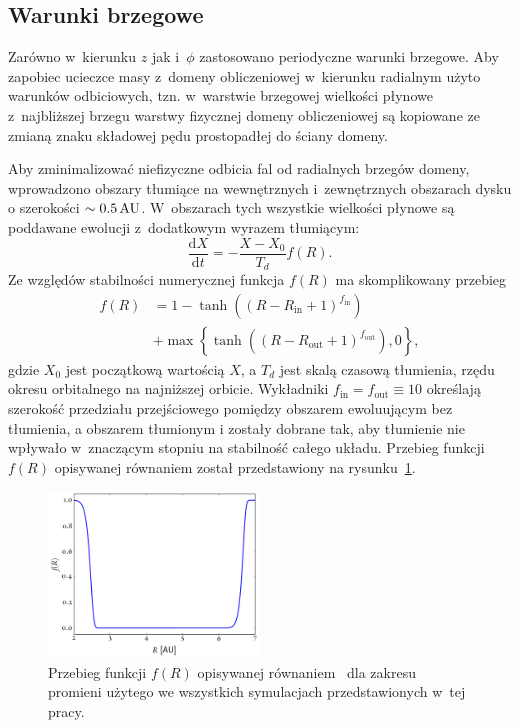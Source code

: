 \subsection{Warunki brzegowe}
Zarówno w~kierunku $z$ jak i~$\phi$ zastosowano periodyczne warunki brzegowe.
Aby zapobiec ucieczce masy z~domeny obliczeniowej w~kierunku radialnym użyto
warunków odbiciowych, tzn. w~warstwie brzegowej wielkości płynowe z~najbliższej
brzegu warstwy fizycznej domeny obliczeniowej są kopiowane ze zmianą znaku
składowej pędu prostopadłej do ściany domeny.

\par Aby zminimalizować niefizyczne odbicia fal od radialnych brzegów domeny,
wprowadzono obszary tłumiące na wewnętrznych i~zewnętrznych obszarach dysku o
szerokości $\sim0.5\hbox{$\thinspace\textrm{AU}$}$. W~obszarach tych wszystkie wielkości płynowe są
poddawane ewolucji z~dodatkowym wyrazem tłumiącym:
\begin{equation}
  \frac{\textrm{d}X}{\textrm{d}t} = - \frac{X-X_0}{T_d}f(R).
\end{equation}
Ze względów stabilności numerycznej funkcja $f(R)$ ma skomplikowany przebieg
\begin{equation}\label{eq:overlap}
   \begin{split} 
      f(R) &= 1 - \tanh\left(\left(R - R_\textrm{in} + 1
      \right)^{f_\textrm{in}}\right)\\ &+ \max\left\{ \tanh\left(\left(R -
      R_\textrm{out} + 1\right)^{f_\textrm{out}}\right), 0\right\}, 
   \end{split}
\end{equation}
gdzie $X_0$ jest początkową wartością $X$, a $T_d$ jest skalą czasową tłumienia,
rzędu okresu orbitalnego na najniższej orbicie.
Wykładniki $f_\textrm{in}=f_\textrm{out}\equiv10$ określają szerokość przedziału
przejściowego pomiędzy obszarem ewoluującym bez tłumienia, a obszarem tłumionym
i zostały dobrane tak, aby tłumienie nie wpływało w~znaczącym stopniu na
stabilność całego układu. Przebieg funkcji $f(R)$ opisywanej równaniem
 został przedstawiony na rysunku~\ref{fig:overlap}.
%
\begin{figure}
   \centering
   \includegraphics[width=0.5\textwidth]{figures/overlap}
   \caption{Przebieg funkcji $f(R)$ opisywanej równaniem~ dla
   zakresu promieni użytego we wszystkich symulacjach przedstawionych w~tej
pracy.}
   \label{fig:overlap}
\end{figure}
%
